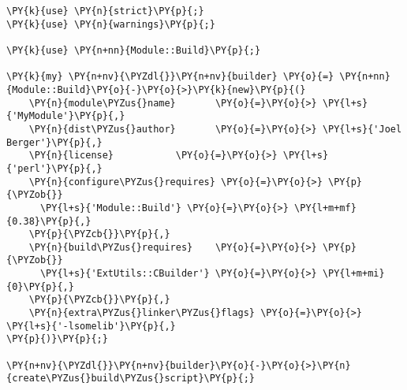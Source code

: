 \begin{Verbatim}[commandchars=\\\{\}]
\PY{k}{use} \PY{n}{strict}\PY{p}{;}
\PY{k}{use} \PY{n}{warnings}\PY{p}{;}

\PY{k}{use} \PY{n+nn}{Module::Build}\PY{p}{;}

\PY{k}{my} \PY{n+nv}{\PYZdl{}}\PY{n+nv}{builder} \PY{o}{=} \PY{n+nn}{Module::Build}\PY{o}{-}\PY{o}{>}\PY{k}{new}\PY{p}{(}
    \PY{n}{module\PYZus{}name}       \PY{o}{=}\PY{o}{>} \PY{l+s}{'MyModule'}\PY{p}{,}
    \PY{n}{dist\PYZus{}author}       \PY{o}{=}\PY{o}{>} \PY{l+s}{'Joel Berger'}\PY{p}{,}
    \PY{n}{license}           \PY{o}{=}\PY{o}{>} \PY{l+s}{'perl'}\PY{p}{,}
    \PY{n}{configure\PYZus{}requires} \PY{o}{=}\PY{o}{>} \PY{p}{\PYZob{}}
      \PY{l+s}{'Module::Build'} \PY{o}{=}\PY{o}{>} \PY{l+m+mf}{0.38}\PY{p}{,}
    \PY{p}{\PYZcb{}}\PY{p}{,}
    \PY{n}{build\PYZus{}requires}    \PY{o}{=}\PY{o}{>} \PY{p}{\PYZob{}}
      \PY{l+s}{'ExtUtils::CBuilder'} \PY{o}{=}\PY{o}{>} \PY{l+m+mi}{0}\PY{p}{,}
    \PY{p}{\PYZcb{}}\PY{p}{,}    
    \PY{n}{extra\PYZus{}linker\PYZus{}flags} \PY{o}{=}\PY{o}{>} \PY{l+s}{'-lsomelib'}\PY{p}{,}
\PY{p}{)}\PY{p}{;}

\PY{n+nv}{\PYZdl{}}\PY{n+nv}{builder}\PY{o}{-}\PY{o}{>}\PY{n}{create\PYZus{}build\PYZus{}script}\PY{p}{;}
\end{Verbatim}
